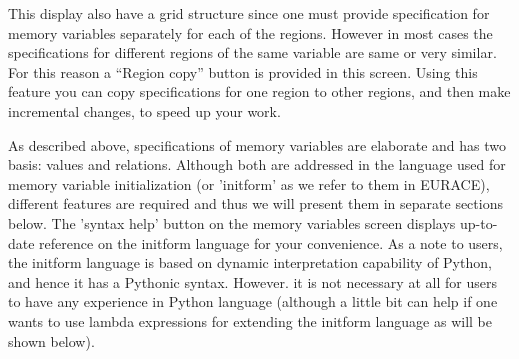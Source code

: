 \documentclass{article}
\begin{document}
This display also have a grid structure since one must provide specification for memory variables separately for each of the regions. However in most cases the specifications for different regions of the same variable are same or very similar. For this reason a ``Region copy'' button is provided in this screen. Using this feature you can copy specifications for one region to other regions, and then make incremental changes, to speed up your work.

As described above, specifications of memory variables are elaborate and has two basis: values and relations. Although both are addressed in the language used for memory variable initialization (or 'initform' as we refer to them in EURACE), different features are required and thus we will present them in separate sections below. The 'syntax help' button on the memory variables screen displays up-to-date reference on the initform language for your convenience. As a note to users, the initform language is based on dynamic interpretation capability of Python, and hence it has a Pythonic syntax. However. it is not necessary at all for users to have any experience in Python language (although a little bit can help if one wants to use lambda expressions for extending the initform language as will be shown below).
\end{document}
